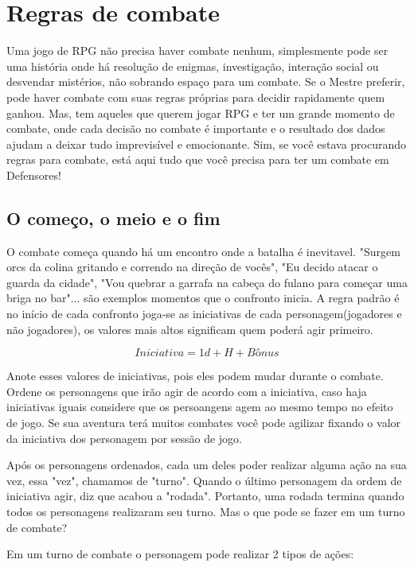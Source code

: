 \chapter{Regras de combate}
\label{ch:combat}

Uma jogo de RPG não precisa haver combate nenhum, simplesmente pode ser uma história onde há resolução de enigmas, investigação, interação social ou desvendar mistérios, não sobrando espaço para um combate. Se o Mestre preferir, pode haver combate com suas regras próprias para decidir rapidamente quem ganhou. Mas, tem aqueles que querem jogar RPG e ter um grande momento de combate, onde cada decisão no combate é importante e o resultado dos dados ajudam a deixar tudo imprevisível e emocionante. Sim, se você estava procurando regras para combate, está aqui tudo que você precisa para ter um combate em Defensores!

\section{O começo, o meio e o fim}

O combate começa quando há um encontro onde a batalha é inevitavel. "Surgem orcs da colina gritando e correndo na direção de vocês", "Eu decido atacar o guarda da cidade", "Vou quebrar a garrafa na cabeça do fulano para começar uma briga no bar"... são exemplos momentos que o confronto inicia. A regra padrão é no início de cada confronto joga-se as iniciativas de cada personagem(jogadores e não jogadores), os valores mais altos significam quem poderá agir primeiro.

\[ Iniciativa = 1d + H + Bônus \]

Anote esses valores de iniciativas, pois eles podem mudar durante o combate. Ordene os personagens que irão agir de acordo com a iniciativa, caso haja iniciativas iguais considere que os persoangens agem ao mesmo tempo no efeito de jogo. Se sua aventura terá muitos combates você pode agilizar fixando o valor da iniciativa dos personagem por sessão de jogo.

Após os personagens ordenados, cada um deles poder realizar alguma ação na sua vez, essa "vez", chamamos de "turno". Quando o último personagem da ordem de iniciativa agir, diz que acabou a "rodada". Portanto, uma rodada termina quando todos os personagens realizaram seu turno. Mas o que pode se fazer em um turno de combate?

Em um turno de combate o personagem pode realizar 2 tipos de ações:

